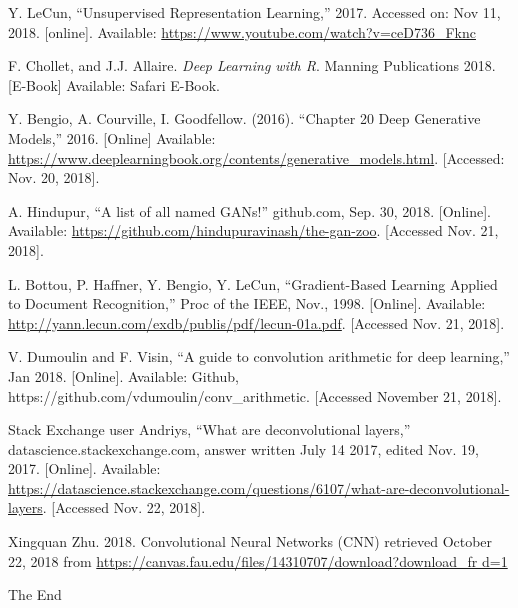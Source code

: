 \documentclass{beamer}
\begin{document}
\begin{frame}[allowframebreaks]
{\begin{thebibliography}{99}
 Y. LeCun, ``Unsupervised Representation Learning,''
2017. Accessed on: Nov 11, 2018. [online]. Available: \url{https://www.youtube.com/watch?v=ceD736_Fknc}  

 F. Chollet, and J.J. Allaire.  
\textit{Deep Learning with R}. Manning Publications 2018. [E-Book] Available: Safari
E-Book.

 Y. Bengio, A. Courville, I. Goodfellow. (2016). ``Chapter 20 Deep Generative Models,'' 2016. [Online] Available: \url{https://www.deeplearningbook.org/contents/generative_models.html}. [Accessed: Nov. 20, 2018].

 A. Hindupur, ``A list of all named GANs!'' github.com, Sep. 30,
2018. [Online]. Available: \url{https://github.com/hindupuravinash/the-gan-zoo}. 
[Accessed Nov. 21, 2018]. 

 L. Bottou, P. Haffner, Y. Bengio, Y. LeCun, ``Gradient-Based Learning
Applied to Document Recognition,'' Proc of the IEEE, Nov., 1998. [Online]. Available:
\url{http://yann.lecun.com/exdb/publis/pdf/lecun-01a.pdf}. [Accessed Nov. 21, 2018].

 V. Dumoulin and F. Visin, ``A guide to convolution arithmetic for 
deep learning,'' Jan 2018. [Online]. Available: Github, https://github.com/vdumoulin/conv\_arithmetic.  [Accessed November 21, 2018].

 Stack Exchange user Andriys, ``What are deconvolutional layers,''
datascience.stackexchange.com, answer written July 14 2017, edited Nov. 19, 2017. 
[Online]. Available: 
\url{https://datascience.stackexchange.com/questions/6107/what-are-deconvolutional-layers}. 
[Accessed Nov.  22, 2018].

 Xingquan Zhu. 2018. Convolutional Neural Networks (CNN) retrieved
 October 22, 2018 from \url{https://canvas.fau.edu/files/14310707/download?download\_fr
d=1}

\end{thebibliography}
}
\end{frame}


\begin{frame}
\Huge{\centerline{The End}}
\end{frame}

\end{document}
